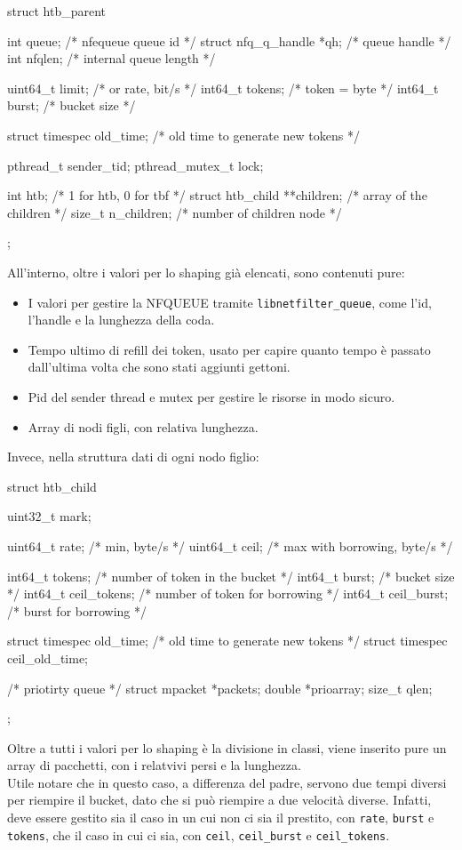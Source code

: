 \begin{clang}
struct htb_parent {
    int queue;                /* nfequeue queue id */
    struct nfq_q_handle *qh;  /* queue handle */
    int nfqlen;               /* internal queue length */

    uint64_t limit;   /* or rate, bit/s */
    int64_t tokens;   /* token = byte */
    int64_t burst;    /* bucket size */

    struct timespec old_time;  /* old time to generate new tokens */

    pthread_t sender_tid;
    pthread_mutex_t lock;

    int htb;                       /* 1 for htb, 0 for tbf */
    struct htb_child **children;   /* array of the children */
    size_t n_children;             /* number of children node */
};
\end{clang}

All'interno, oltre i valori per lo shaping già elencati, sono contenuti pure:
\begin{itemize}
  \item I valori per gestire la NFQUEUE tramite \texttt{libnetfilter\_queue}, come l'id, l'handle e la lunghezza della coda.
  \item Tempo ultimo di refill dei token, usato per capire quanto tempo è passato dall'ultima volta che sono stati aggiunti gettoni.
  \item Pid del sender thread e mutex per gestire le risorse in modo sicuro.
  \item Array di nodi figli, con relativa lunghezza.
\end{itemize}

Invece, nella struttura dati di ogni nodo figlio:
\begin{clang}
struct htb_child {
    uint32_t mark;

    uint64_t rate;         /* min, byte/s */
    uint64_t ceil;         /* max with borrowing, byte/s */

    int64_t tokens;        /* number of token in the bucket */
    int64_t burst;         /* bucket size */
    int64_t ceil_tokens;   /* number of token for borrowing */
    int64_t ceil_burst;    /* burst for borrowing */

    struct timespec old_time;  /* old time to generate new tokens */
    struct timespec ceil_old_time; 

    /* priotirty queue */
    struct mpacket *packets;
    double *prioarray;
    size_t qlen;
};
\end{clang}
Oltre a tutti i valori per lo shaping è la divisione in classi, viene inserito pure un array di pacchetti, con i relatvivi persi e la lunghezza. \\
Utile notare che in questo caso, a differenza del padre, servono due tempi diversi per riempire il bucket, dato che si può riempire a due velocità diverse.
Infatti, deve essere gestito sia il caso in un cui non ci sia il prestito, con \texttt{rate}, \texttt{burst} e \texttt{tokens}, che il caso in cui ci sia, con \texttt{ceil}, \texttt{ceil\_burst} e \texttt{ceil\_tokens}.

